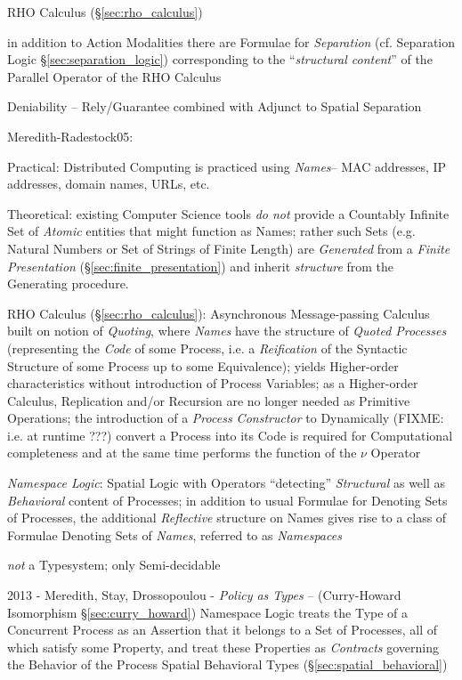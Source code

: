 RHO Calculus (\S\ref{sec:rho_calculus})

in addition to Action Modalities there are Formulae for \emph{Separation} (cf.
Separation Logic \S\ref{sec:separation_logic}) corresponding to the
``\emph{structural content}'' of the Parallel Operator of the RHO Calculus

Deniability -- Rely/Guarantee combined with Adjunct to Spatial Separation

\asterism

Meredith-Radestock05:

Practical: Distributed Computing is practiced using \emph{Names}-- MAC
addresses, IP addresses, domain names, URLs, etc.

Theoretical: existing Computer Science tools \emph{do not} provide a Countably
Infinite Set of \emph{Atomic} entities that might function as Names; rather such
Sets (e.g. Natural Numbers or Set of Strings of Finite Length) are
\emph{Generated} from a \emph{Finite Presentation}
(\S\ref{sec:finite_presentation}) and inherit \emph{structure} from the
Generating procedure.

RHO Calculus (\S\ref{sec:rho_calculus}): Asynchronous Message-passing Calculus
built on notion of \emph{Quoting}, where \emph{Names} have the structure of
\emph{Quoted Processes} (representing the \emph{Code} of some Process, i.e. a
\emph{Reification} of the Syntactic Structure of some Process up to some
Equivalence); yields Higher-order characteristics without introduction of
Process Variables; as a Higher-order Calculus, Replication and/or Recursion are
no longer needed as Primitive Operations; the introduction of a \emph{Process
  Constructor} to Dynamically (FIXME: i.e. at runtime ???) convert a Process
into its Code is required for Computational completeness and at the same time
performs the function of the $\nu$ Operator

\emph{Namespace Logic}: Spatial Logic with Operators ``detecting''
\emph{Structural} as well as \emph{Behavioral} content of Processes; in addition
to usual Formulae for Denoting Sets of Processes, the additional
\emph{Reflective} structure on Names gives rise to a class of Formulae Denoting
Sets of \emph{Names}, referred to as \emph{Namespaces}

\emph{not} a Typesystem; only Semi-decidable

\asterism

2013 - Meredith, Stay, Drossopoulou - \emph{Policy as Types} -- (Curry-Howard
Isomorphism \S\ref{sec:curry_howard}) Namespace Logic treats the Type of a
Concurrent Process as an Assertion that it belongs to a Set of Processes, all of
which satisfy some Property, and treat these Properties as \emph{Contracts}
governing the Behavior of the Process \fist Spatial Behavioral Types
(\S\ref{sec:spatial_behavioral})

